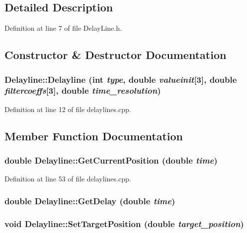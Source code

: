 \subsection{Detailed Description}


Definition at line 7 of file DelayLine.h.



\subsection{Constructor \& Destructor Documentation}
\hypertarget{classDelayline_a4f150b5cc20cf2b07edc73f567e67b6a}{
\subsubsection[{Delayline}]{\setlength{\rightskip}{0pt plus 5cm}Delayline::Delayline (int {\em type}, \/  double {\em valueinit}\mbox{[}3\mbox{]}, \/  double {\em filtercoeffs}\mbox{[}3\mbox{]}, \/  double {\em time\_\-resolution})}}
\label{classDelayline_a4f150b5cc20cf2b07edc73f567e67b6a}


Definition at line 12 of file delaylines.cpp.



\subsection{Member Function Documentation}
\hypertarget{classDelayline_ad1078e7e31e7a122426bf8657f6c2ebd}{
\subsubsection[{GetCurrentPosition}]{\setlength{\rightskip}{0pt plus 5cm}double Delayline::GetCurrentPosition (double {\em time})}}
\label{classDelayline_ad1078e7e31e7a122426bf8657f6c2ebd}


Definition at line 53 of file delaylines.cpp.

\hypertarget{classDelayline_ac42a46567eff7c08d9407eec9d6d67eb}{
\subsubsection[{GetDelay}]{\setlength{\rightskip}{0pt plus 5cm}double Delayline::GetDelay (double {\em time})}}
\label{classDelayline_ac42a46567eff7c08d9407eec9d6d67eb}
\hypertarget{classDelayline_a82a38ed6acf042f38e88e88b72fa3727}{
\subsubsection[{SetTargetPosition}]{\setlength{\rightskip}{0pt plus 5cm}void Delayline::SetTargetPosition (double {\em target\_\-position})}}
\label{classDelayline_a82a38ed6acf042f38e88e88b72fa3727}


